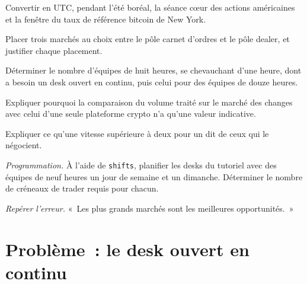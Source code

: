 \begin{exercise}[$\star$]\label{exo:m3:a-map-of-all-markets:2}
Convertir en UTC, pendant l'été boréal, la séance cœur des actions américaines et la fenêtre du taux de référence bitcoin de New York.
\end{exercise}

\begin{exercise}[$\star$]\label{exo:m3:a-map-of-all-markets:3}
Placer trois marchés au choix entre le pôle carnet d'ordres et le pôle dealer, et justifier chaque placement.
\end{exercise}

\begin{exercise}[$\star\star$]\label{exo:m3:a-map-of-all-markets:4}
Déterminer le nombre d'équipes de huit heures, se chevauchant d'une heure, dont a besoin un desk ouvert en continu, puis celui pour des équipes de douze heures.
\end{exercise}

\begin{exercise}[$\star\star$]\label{exo:m3:a-map-of-all-markets:5}
Expliquer pourquoi la comparaison du volume traité sur le marché des changes avec celui d'une seule plateforme crypto n'a qu'une valeur indicative.
\end{exercise}

\begin{exercise}[$\star\star$]\label{exo:m3:a-map-of-all-markets:6}
Expliquer ce qu'une vitesse supérieure à deux pour un  dit de ceux qui le négocient.
\end{exercise}

\begin{exercise}[$\star\star\star$]\label{exo:m3:a-map-of-all-markets:7}
\emph{Programmation.} À l'aide de \texttt{shifts}, planifier les desks du tutoriel avec des équipes de neuf heures un jour de semaine et un dimanche. Déterminer le nombre de créneaux de trader requis pour chacun.
\end{exercise}

\begin{exercise}[$\star\star\star$]\label{exo:m3:a-map-of-all-markets:8}
\emph{Repérer l'erreur.} «~Les plus grands marchés sont les meilleures opportunités.~»
\end{exercise}

\section{Problème~: le desk ouvert en continu}


